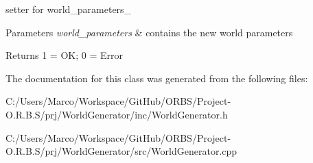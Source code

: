 setter for world\-\_\-parameters\-\_\- 


\begin{DoxyParams}{Parameters}
{\em world\-\_\-parameters} & contains the new world parameters \\
\hline
\end{DoxyParams}
\begin{DoxyReturn}{Returns}
1 = O\-K; 0 = Error 
\end{DoxyReturn}


The documentation for this class was generated from the following files\-:\begin{DoxyCompactItemize}
\item 
C\-:/\-Users/\-Marco/\-Workspace/\-Git\-Hub/\-O\-R\-B\-S/\-Project-\/\-O.\-R.\-B.\-S/prj/\-World\-Generator/inc/World\-Generator.\-h\item 
C\-:/\-Users/\-Marco/\-Workspace/\-Git\-Hub/\-O\-R\-B\-S/\-Project-\/\-O.\-R.\-B.\-S/prj/\-World\-Generator/src/World\-Generator.\-cpp\end{DoxyCompactItemize}
